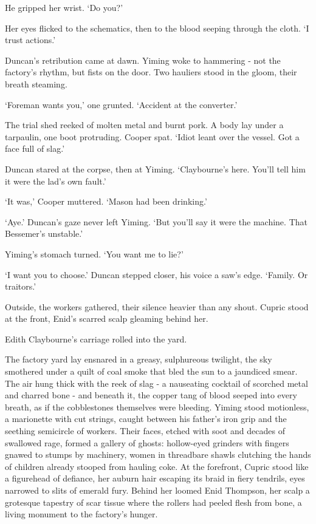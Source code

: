 He gripped her wrist. `Do you?'

Her eyes flicked to the schematics, then to the blood seeping through the cloth. `I trust actions.'

Duncan's retribution came at dawn. Yiming woke to hammering - not the factory's rhythm, but fists on the door. Two hauliers stood in the gloom, their breath steaming.

`Foreman wants you,' one grunted. `Accident at the converter.'

The trial shed reeked of molten metal and burnt pork. A body lay under a tarpaulin, one boot protruding. Cooper spat. `Idiot leant over the vessel. Got a face full of slag.'

Duncan stared at the corpse, then at Yiming. `Claybourne's here. You'll tell him it were the lad's own fault.'

`It was,' Cooper muttered. `Mason had been drinking.'

`Aye.' Duncan's gaze never left Yiming. `But you'll say it were the machine. That Bessemer's unstable.'

Yiming's stomach turned. `You want me to lie?'

`I want you to choose.' Duncan stepped closer, his voice a saw's edge. `Family. Or traitors.'

Outside, the workers gathered, their silence heavier than any shout. Cupric stood at the front, Enid's scarred scalp gleaming behind her.

Edith Claybourne's carriage rolled into the yard.

The factory yard lay ensnared in a greasy, sulphureous twilight, the sky smothered under a quilt of coal smoke that bled the sun to a jaundiced smear. The air hung thick with the reek of slag - a nauseating cocktail of scorched metal and charred bone - and beneath it, the copper tang of blood seeped into every breath, as if the cobblestones themselves were bleeding. Yiming stood motionless, a marionette with cut strings, caught between his father's iron grip and the seething semicircle of workers. Their faces, etched with soot and decades of swallowed rage, formed a gallery of ghosts: hollow-eyed grinders with fingers gnawed to stumps by machinery, women in threadbare shawls clutching the hands of children already stooped from hauling coke. At the forefront, Cupric stood like a figurehead of defiance, her auburn hair escaping its braid in fiery tendrils, eyes narrowed to slits of emerald fury. Behind her loomed Enid Thompson, her scalp a grotesque tapestry of scar tissue where the rollers had peeled flesh from bone, a living monument to the factory's hunger.

